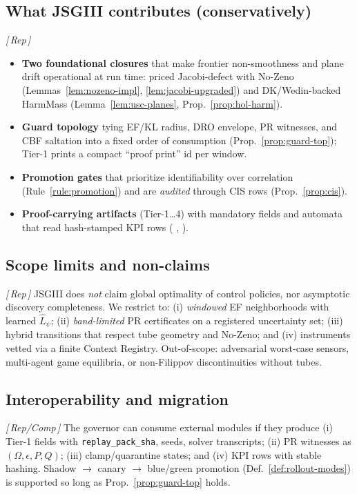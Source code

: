 \documentclass[10pt]{article}
\makeatletter
\newcommand{\layertag}[1]{\textsf{\footnotesize[\,#1\,]}}
\newcommand{\JSGxref}[2]{%
  \@ifundefined{r@#2}{\textbf{[#1 ??]}}{#1~\ref{#2}}}
\newcommand{\secref}[1]{\JSGxref{§}{#1}}
\makeatother
\begin{document}
\subsection{What JSGIII contributes (conservatively)}\label{subsec:rel-contrib}
\emph{\layertag{Rep}}
\begin{itemize}[leftmargin=*]
\item \textbf{Two foundational closures} that make frontier non-smoothness and plane drift operational at run time: priced Jacobi-defect with No-Zeno (Lemmas~\ref{lem:nozeno-impl}, \ref{lem:jacobi-upgraded}) and DK/Wedin-backed HarmMass (Lemma~\ref{lem:usc-planes}, Prop.~\ref{prop:hol-harm}).
\item \textbf{Guard topology} tying EF/KL radius, DRO envelope, PR witnesses, and CBF saltation into a fixed order of consumption (Prop.~\ref{prop:guard-top}); Tier-1 prints a compact “proof print” id per window.
\item \textbf{Promotion gates} that prioritize identifiability over correlation (Rule~\ref{rule:promotion}) and are \emph{audited} through CIS rows (Prop.~\ref{prop:cis}).
\item \textbf{Proof-carrying artifacts} (Tier-1…4) with mandatory fields and automata that read hash-stamped KPI rows (\secref{subsec:schemas}, \secref{subsec:automata}).
\end{itemize}

\subsection{Scope limits and non-claims}\label{subsec:rel-nonclaims}
\emph{\layertag{Rep}}
JSGIII does \emph{not} claim global optimality of control policies, nor asymptotic discovery completeness. We restrict to: (i) \emph{windowed} EF neighborhoods with learned $\hat L_\psi$; (ii) \emph{band-limited} PR certificates on a registered uncertainty set; (iii) hybrid transitions that respect tube geometry and No-Zeno; and (iv) instruments vetted via a finite Context Registry. Out-of-scope: adversarial worst-case sensors, multi-agent game equilibria, or non-Filippov discontinuities without tubes.

\subsection{Interoperability and migration}\label{subsec:rel-migrate}
\emph{\layertag{Rep/Comp}}
The governor can consume external modules if they produce (i) Tier-1 fields with \texttt{replay\_pack\_sha}, seeds, solver transcripts; (ii) PR witnesses as $(\Omega,\epsilon,P,Q)$; (iii) clamp/quarantine states; and (iv) KPI rows with stable hashing. Shadow $\rightarrow$ canary $\rightarrow$ blue/green promotion (Def.~\ref{def:rollout-modes}) is supported so long as Prop.~\ref{prop:guard-top} holds.
\end{document}
